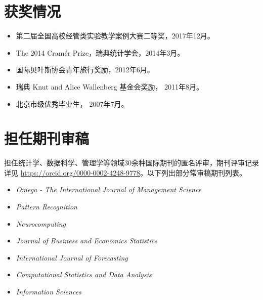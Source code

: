 \documentclass[twoside,a4paper,11pt]{article}
\begin{document}
\section*{获奖情况}
\begin{itemize}

\item 第二届全国高校经管类实验教学案例大赛二等奖，2017年12月。
\item The 2014 Cramér Prize，瑞典统计学会，2014年3月。

\item 国际贝叶斯协会青年旅行奖励，2012年6月。

\item 瑞典 Knut and Alice Wallenberg 基金会奖励， 2011年8月。

\item 北京市级优秀毕业生， 2007年7月。
\end{itemize}

\section*{担任期刊审稿}

担任统计学、数据科学、管理学等领域30余种国际期刊的匿名评审，期刊评审记录详见 \url{https://orcid.org/0000-0002-4248-9778}。以下列出部分常审稿期刊列表。

\begin{itemize}
\item \emph{Omega - The International Journal of Management Science}
\item \emph{Pattern Recognition}
\item \emph{Neurocomputing}
\item  \emph{Journal of Business and Economics Statistics}
\item  \emph{International Journal of Forecasting}
\item  \emph{Computational Statistics and Data Analysis}
\item  \emph{Information Sciences}
\end{itemize}
\end{document}
